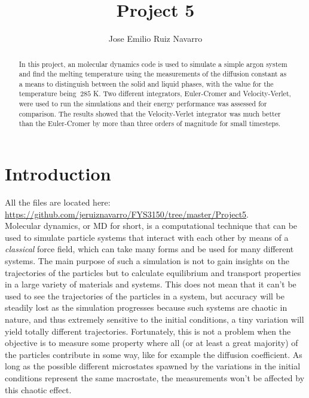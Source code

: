 \documentclass[11pt,a4paper,oneside]{article}
\begin{document}
	\title{\textbf{\textbf{\Huge Project 5}}}
	\author{Jose Emilio Ruiz Navarro}
	\maketitle
	\begin{abstract}In this project, an molecular dynamics code is used to simulate a simple argon system and find the melting temperature using the measurements of the diffusion constant as a means to distinguish between the solid and liquid phases, with the value for the temperature being $~285$ K. Two different integrators, Euler-Cromer and Velocity-Verlet, were used to run the simulations and their energy performance was assessed for comparison. The results showed that the Velocity-Verlet integrator was much better than the Euler-Cromer by more than three orders of magnitude for small timesteps.\end{abstract}
	\newpage
	\tableofcontents
	\newpage
	
	\section{Introduction}
	
		All the files are located here: \url{https://github.com/jeruiznavarro/FYS3150/tree/master/Project5}.\\
	
		Molecular dynamics, or MD for short, is a computational technique that can be used to simulate particle systems that interact with each other by means of a \textit{classical} force field, which can take many forms and be used for many different systems. The main purpose of such a simulation is not to gain insights on the trajectories of the particles but to calculate equilibrium and transport properties in a large variety of materials and systems. This does not mean that it can't be used to see the trajectories of the particles in a system, but accuracy will be steadily lost as the simulation progresses because such systems are chaotic in nature, and thus extremely sensitive to the initial conditions, a tiny variation will yield totally different trajectories. Fortunately, this is not a problem when the objective is to measure some property where all (or at least a great majority) of the particles contribute in some way, like for example the diffusion coefficient. As long as the possible different microstates spawned by the variations in the initial conditions represent the same macrostate, the measurements won't be affected by this chaotic effect.\\
		
\end{document}
